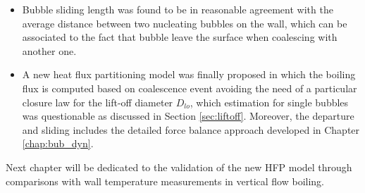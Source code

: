 \begin{itemize}
\item Bubble sliding length was found to be in reasonable agreement with the average distance between two nucleating bubbles on the wall, which can be associated to the fact that bubble leave the surface when coalescing with another one.

\item A new heat flux partitioning model was finally proposed in which the boiling flux is computed based on coalescence event avoiding the need of a particular closure law for the lift-off diameter $D_{lo}$, which estimation for single bubbles was questionable as discussed in Section \ref{sec:liftoff}. Moreover, the departure and sliding includes the detailed force balance approach developed in Chapter \ref{chap:bub_dyn}.
\end{itemize}

Next chapter will be dedicated to the validation of the new HFP model through comparisons with wall temperature measurements in vertical flow boiling.
